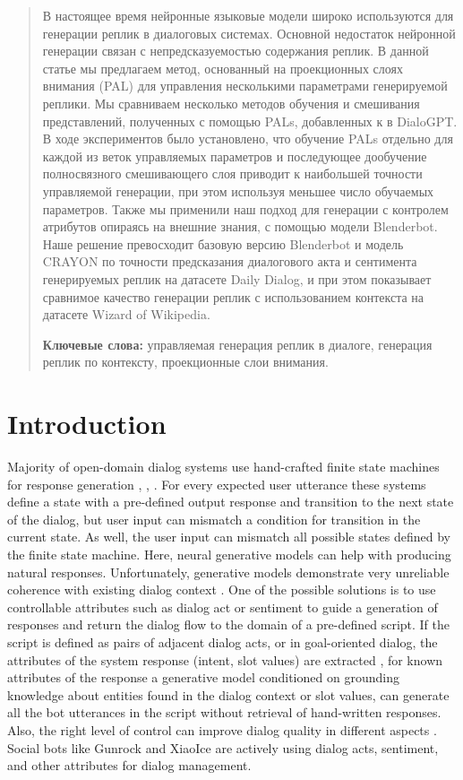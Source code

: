 \documentclass[11pt]{article}
\begin{document}
\begin{abstract}
В настоящее время нейронные языковые модели широко используются для генерации реплик в диалоговых системах. Основной недостаток нейронной генерации связан с непредсказуемостью содержания реплик. В данной статье мы предлагаем метод, основанный на проекционных слоях внимания (PAL) для управления несколькими параметрами генерируемой реплики. Мы сравниваем несколько методов обучения и смешивания представлений, полученных с помощью PALs, добавленных к в DialoGPT. В ходе экспериментов было установлено, что обучение PALs отдельно для каждой из веток управляемых параметров и последующее дообучение полносвязного смешивающего слоя приводит к наибольшей точности управляемой генерации, при этом используя меньшее число обучаемых параметров. Также мы применили наш подход для генерации с контролем атрибутов опираясь на внешние знания, с помощью модели Blenderbot. Наше решение превосходит базовую версию Blenderbot и модель CRAYON по точности предсказания диалогового акта и сентимента генерируемых реплик на датасете Daily Dialog, и при этом показывает сравнимое качество генерации реплик с использованием контекста на датасете Wizard of Wikipedia.
  
  \textbf{Ключевые слова:} управляемая генерация реплик в диалоге, генерация реплик по контексту, проекционные слои внимания.
\end{abstract}

\section{Introduction}
\label{intro}

Majority of open-domain dialog systems use hand-crafted finite state machines for response generation \cite{larsson2000information}, \cite{bocklisch2017rasa}, \cite{finch2020emora}. For every expected user utterance these systems define a state with a pre-defined output response and transition to the next state of the dialog, but user input can mismatch a condition for transition in the current state.  As well, the user input can mismatch all possible states defined by the finite state machine. Here, neural generative models can help with producing natural responses. Unfortunately, generative models demonstrate very unreliable coherence with existing dialog context \cite{abhishek2021transformer}. One of the possible solutions is to use controllable attributes such as dialog act or sentiment to guide a generation of responses and return the dialog flow to the domain of a pre-defined script. If the script is defined as pairs of adjacent dialog acts, or in goal-oriented dialog, the attributes of the system response (intent, slot values) are extracted \cite{wu-etal-2019-transferable}, for known attributes of the response a generative model conditioned on grounding knowledge about entities found in the dialog context or slot values, can generate all the bot utterances in the script without retrieval of hand-written responses. Also, the right level of control can improve dialog quality in different aspects \cite{see2019makes}. Social bots like Gunrock \cite{gunrock} and XiaoIce \cite{zhou2019design} are actively using dialog acts, sentiment, and other attributes for dialog management.
\end{document}
